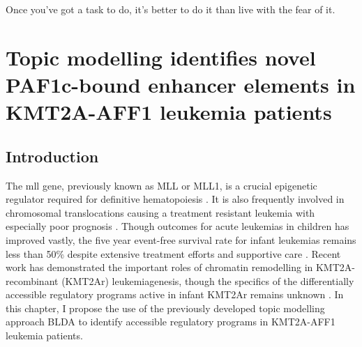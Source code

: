 \begin{savequote}[8cm]
    Once you've got a task to do, it's better to do it than live with the fear of it.
\end{savequote}

\chapter{Topic modelling identifies novel PAF1c-bound enhancer elements in KMT2A-AFF1 leukemia patients}

\minitoc


\section{Introduction} \label{ch5:intro}

The \gls{mll} gene, previously known as MLL or MLL1, is a crucial epigenetic regulator required for definitive hematopoiesis \cite{Ernst2004a}. It is also frequently involved in chromosomal translocations causing a treatment resistant leukemia with especially poor prognosis \cite{Krivtsov2007}. Though outcomes for acute leukemias in children has improved vastly, the five year event-free survival rate for infant leukemias remains less than 50\% despite extensive treatment efforts and supportive care \cite{Rice2020}. Recent work has demonstrated the important roles of chromatin remodelling in KMT2A-recombinant (KMT2Ar) leukemiagenesis, though the specifics of the differentially accessible regulatory programs active in infant KMT2Ar remains unknown \cite{Erfurth2003}. In this chapter, I propose the use of the previously developed topic modelling approach BLDA to identify accessible regulatory programs in KMT2A-AFF1 leukemia patients.  

